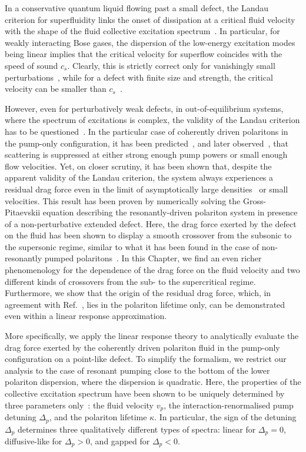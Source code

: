 In a conservative quantum liquid flowing past a small defect, the
Landau criterion for superfluidity links the onset of dissipation at a
critical fluid velocity with the shape of the fluid collective
excitation spectrum~\cite{9780198507192}. In particular, for weakly
interacting Bose gases, the dispersion of the low-energy excitation
modes being linear implies that the critical velocity for superflow
coincides with the speed of sound $c_s$. Clearly, this is strictly
correct only for vanishingly small
perturbations~\cite{Astrakharchik_2004}, while for a defect with finite
size and strength, the critical velocity can be smaller than
$c_s$~\cite{Onofrio_2000,Ianeselli_2006}.

However, even for perturbatively weak defects, in out-of-equilibrium
systems, where the spectrum of excitations is complex, the validity of
the Landau criterion has to be
questioned~\cite{Szyma_ska_2006,Wouters_2010,Cancellieri_2010}. In the
particular case of coherently driven polaritons in the pump-only
configuration, it has been predicted~\cite{Carusotto_2004,Ciuti_2005}, and
later observed~\cite{Amo_2009}, that scattering is suppressed at either
strong enough pump powers or small enough flow velocities. Yet, on 
closer scrutiny, it has been shown that, despite the apparent validity
of the Landau criterion, the system always experiences a residual drag
force even in the limit of asymptotically large
densities~\cite{Cancellieri_2010} or small velocities. This result has
been proven by numerically solving the Gross-Pitaevskii equation
describing the resonantly-driven polariton system in presence of a
non-perturbative extended defect. Here, the drag force exerted by the
defect on the fluid has been shown to display a smooth crossover from
the subsonic to the supersonic regime, similar to what it has been
found in the case of non-resonantly pumped
polaritons~\cite{Wouters_2010}. In this Chapter, we find an even richer
phenomenology for the dependence of the drag force on the fluid
velocity and two different kinds of crossovers from the sub- to the
supercritical regime. Furthermore, we show that the origin of the residual
drag force, which, in agreement with Ref.~\cite{Cancellieri_2010}, lies
in the polariton lifetime only, can be demonstrated even within a
linear response approximation.

More specifically, we apply the linear response theory
to analytically evaluate the drag force exerted by the coherently
driven polariton fluid in the pump-only configuration on a point-like
defect. To simplify the formalism, we restrict our analysis to the
case of resonant pumping close to the bottom of the lower polariton
dispersion, where the dispersion is quadratic. Here, the properties of
the collective excitation spectrum have been shown to be uniquely
determined by three parameters only~\cite{Ciuti_2005}: the fluid
velocity $v_p$, the interaction-renormalised pump detuning $\Delta_p$,
and the polariton lifetime $\kappa$. In particular, the sign of the
detuning $\Delta_p$ determines three qualitatively different types of
spectra: linear for $\Delta_p= 0$, diffusive-like for $\Delta_p> 0$,
and gapped for $\Delta_p< 0$. 

